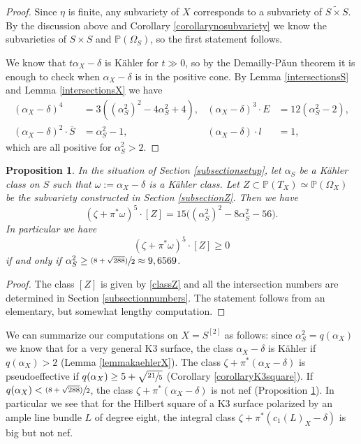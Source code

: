 \documentclass[JEP,XML,SOM,Unicode,NoEqCountersInSection,published]{cedram}
\newcommand{\psfrac}[2]{\sfrac{(#1)}{#2}}
\theoremstyle{plain}
\newtheorem{proposition}[theorem]{Proposition}
\theoremstyle{definition}
\newcommand{\PP}{\ensuremath{\mathbb{P}}}
\newcommand{\barS}{\ensuremath{\overline{S}}}
\newcommand{\blS}{\ensuremath{\widetilde{S \times S}}}
\begin{document}
\begin{proof}
Since $\eta$ is finite, any subvariety of $X$ corresponds to a subvariety of $\blS$. By the discussion above
and Corollary \ref{corollarynosubvariety}
we know the subvarieties of $S \times S$ and $\PP(\Omega_S)$, so the first statement follows.

We know that $t \alpha_X-\delta$ is Kähler for $t \gg 0$, so by the Demailly-P\v aun theorem it is enough to check when
$\alpha_X-\delta$ is in the positive cone. By Lemma \ref{intersectionsS} and Lemma \ref{intersectionsX} we have
\begin{align*}
(\alpha_X-\delta)^4 &= 3 ((\alpha_S^2)^2-4\alpha_S^2+4), &
(\alpha_X-\delta)^3 \cdot E &= 12 (\alpha_S^2-2),
\\
(\alpha_X-\delta)^2 \cdot \barS &= \alpha_S^2-1, &
(\alpha_X-\delta) \cdot l &= 1,
\end{align*}
which are all positive for $\alpha_S^2>2$.
\end{proof}

\begin{proposition} \label{propositionthenumber}
In the situation of Section \ref{subsectionsetup}, let
$\alpha_S$ be a Kähler class on $S$ such that $\omega:= \alpha_X-\delta$ is a Kähler class.
Let $Z \subset \PP(T_X) \simeq \PP(\Omega_X) $ be the subvariety constructed in Section \ref{subsectionZ}. Then we have
\[
(\zeta + \pi^* \omega)^5 \cdot [Z] =
15 \bigl(
(\alpha_S^2)^2 - 8 \alpha_S^2 - 56
\bigr).
\]
In particular we have
\[
(\zeta + \pi^* \omega)^5 \cdot [Z] \geq 0
\]
if and only if $\alpha_S^2 \geq \psfrac{8+\sqrt{288}}{2} \approx 9,6569$.
\end{proposition}

\begin{proof}
The class $[Z]$ is given by \eqref{classZ} and all the intersection numbers are determined in Section \ref{subsectionnumbers}. The statement follows from an elementary, but somewhat lengthy computation.
\end{proof}

We can summarize our computations on $X=S^{[2]}$ as follows:
since $\alpha_S^2=q(\alpha_X)$ we know that
for a very general K3 surface, the class $\alpha_X-\delta$ is Kähler if $q(\alpha_X)>2$ (Lemma \ref{lemmakaehlerX}).
The class $\zeta+\pi^*(\alpha_X-\delta)$ is pseudoeffective if $q(\alpha_X)\geq 5+\sqrt{\sfrac{21}{5}}$ (Corollary \ref{corollaryK3square}).
If $q(\alpha_X) < \psfrac{8+\sqrt{288}}{2}$, the class $\zeta+\pi^*(\alpha_X-\delta)$ is not nef (Proposition \ref{propositionthenumber}).
In particular we see that for the Hilbert square of a K3 surface polarized by an ample line bundle $L$ of degree eight, the integral class $\zeta+\pi^*(c_1(L)_X-\delta)$ is big but not nef.
\end{document}
